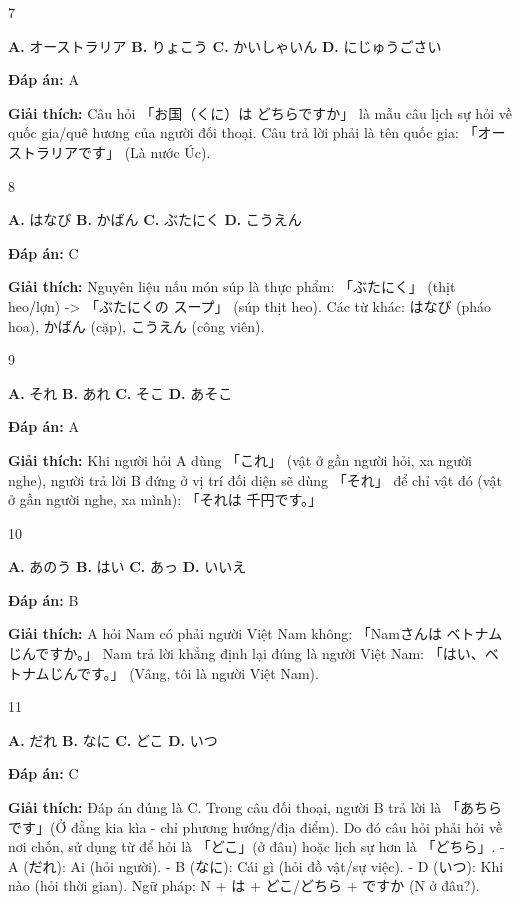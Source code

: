 \documentclass[12pt,a4paper]{report}
\newcommand{\source}[1]{}
\newcommand{\choice}[2]{\textbf{#1.} #2 \quad}
\newcommand{\answer}[1]{\par\textbf{Đáp án:} #1}
\newcommand{\confidence}[1]{}
\newcommand{\explain}[1]{\par\textbf{Giải thích:} #1\vspace{0.5cm}}
\begin{document}
\begin{question}{7}
\source{Q18_56_20251121082827.webp}
\choice{A}{オーストラリア}
\choice{B}{りょこう}
\choice{C}{かいしゃいん}
\choice{D}{にじゅうごさい}
\answer{A}
\confidence{high}
\explain{Câu hỏi 「お国（くに）は どちらですか」 là mẫu câu lịch sự hỏi về quốc gia/quê hương của người đối thoại. Câu trả lời phải là tên quốc gia: 「オーストラリアです」 (Là nước Úc).}
\end{question}

\begin{question}{8}
\source{Q20_131_20251121082830.webp}
\choice{A}{はなび}
\choice{B}{かばん}
\choice{C}{ぶたにく}
\choice{D}{こうえん}
\answer{C}
\confidence{high}
\explain{Nguyên liệu nấu món súp là thực phẩm: 「ぶたにく」 (thịt heo/lợn) -> 「ぶたにくの スープ」 (súp thịt heo). Các từ khác: はなび (pháo hoa), かばん (cặp), こうえん (công viên).}
\end{question}

\begin{question}{9}
\source{Q24_11_20251121082834.webp}
\choice{A}{それ}
\choice{B}{あれ}
\choice{C}{そこ}
\choice{D}{あそこ}
\answer{A}
\confidence{high}
\explain{Khi người hỏi A dùng 「これ」 (vật ở gần người hỏi, xa người nghe), người trả lời B đứng ở vị trí đối diện sẽ dùng 「それ」 để chỉ vật đó (vật ở gần người nghe, xa mình): 「それは 千円です。」}
\end{question}

\begin{question}{10}
\source{Q27_111_20251121082838.webp}
\choice{A}{あのう}
\choice{B}{はい}
\choice{C}{あっ}
\choice{D}{いいえ}
\answer{B}
\confidence{high}
\explain{A hỏi Nam có phải người Việt Nam không: 「Namさんは ベトナムじんですか。」 Nam trả lời khẳng định lại đúng là người Việt Nam: 「はい、ベトナムじんです。」 (Vâng, tôi là người Việt Nam).}
\end{question}

\begin{question}{11}
\source{1.webp}
\choice{A}{だれ}
\choice{B}{なに}
\choice{C}{どこ}
\choice{D}{いつ}
\answer{C}
\confidence{high}
\explain{Đáp án đúng là C. Trong câu đối thoại, người B trả lời là 「あちらです」(Ở đằng kia kìa - chỉ phương hướng/địa điểm). Do đó câu hỏi phải hỏi về nơi chốn, sử dụng từ để hỏi là 「どこ」(ở đâu) hoặc lịch sự hơn là 「どちら」.
- A (だれ): Ai (hỏi người).
- B (なに): Cái gì (hỏi đồ vật/sự việc).
- D (いつ): Khi nào (hỏi thời gian).
Ngữ pháp: N + は + どこ/どちら + ですか (N ở đâu?).}
\end{question}
\end{document}
